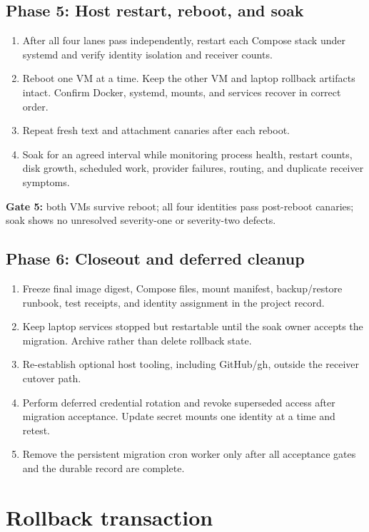 \documentclass[11pt]{article}
\begin{document}
\subsection*{Phase 5: Host restart, reboot, and soak}
\begin{enumerate}
\item After all four lanes pass independently, restart each Compose stack under
systemd and verify identity isolation and receiver counts.
\item Reboot one VM at a time. Keep the other VM and laptop rollback artifacts
intact. Confirm Docker, systemd, mounts, and services recover in correct order.
\item Repeat fresh text and attachment canaries after each reboot.
\item Soak for an agreed interval while monitoring process health, restart
counts, disk growth, scheduled work, provider failures, routing, and duplicate
receiver symptoms.
\end{enumerate}

\textbf{Gate 5:} both VMs survive reboot; all four identities pass post-reboot
canaries; soak shows no unresolved severity-one or severity-two defects.

\subsection*{Phase 6: Closeout and deferred cleanup}
\begin{enumerate}
\item Freeze final image digest, Compose files, mount manifest, backup/restore
runbook, test receipts, and identity assignment in the project record.
\item Keep laptop services stopped but restartable until the soak owner accepts
the migration. Archive rather than delete rollback state.
\item Re-establish optional host tooling, including GitHub/gh, outside the
receiver cutover path.
\item Perform deferred credential rotation and revoke superseded access after
migration acceptance. Update secret mounts one identity at a time and retest.
\item Remove the persistent migration cron worker only after all acceptance
gates and the durable record are complete.
\end{enumerate}

\section{Rollback transaction}
\end{document}
